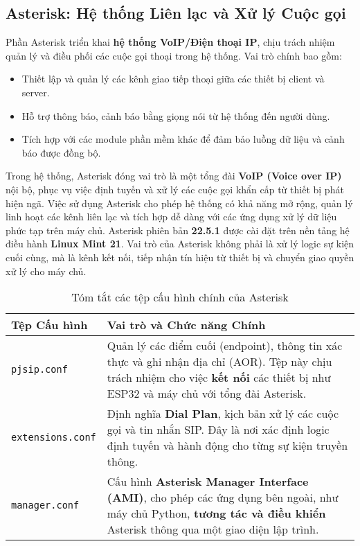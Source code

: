 
\subsection{Asterisk: Hệ thống Liên lạc và Xử lý Cuộc gọi}
\label{sec:asterisk_overview}

Phần Asterisk triển khai \textbf{hệ thống VoIP/Điện thoại IP}, chịu trách nhiệm quản lý và điều phối các cuộc gọi thoại trong hệ thống. Vai trò chính bao gồm:
\begin{itemize}
    \item Thiết lập và quản lý các kênh giao tiếp thoại giữa các thiết bị client và server.
    \item Hỗ trợ thông báo, cảnh báo bằng giọng nói từ hệ thống đến người dùng.
    \item Tích hợp với các module phần mềm khác để đảm bảo luồng dữ liệu và cảnh báo được đồng bộ.
\end{itemize}


Trong hệ thống, Asterisk đóng vai trò là một tổng đài \textbf{VoIP (Voice over IP)} nội bộ, phục vụ việc định tuyến và xử lý các cuộc gọi khẩn cấp từ thiết bị phát hiện ngã. Việc sử dụng Asterisk cho phép hệ thống có khả năng mở rộng, quản lý linh hoạt các kênh liên lạc và tích hợp dễ dàng với các ứng dụng xử lý dữ liệu phức tạp trên máy chủ. Asterisk phiên bản \textbf{22.5.1} được cài đặt trên nền tảng hệ điều hành \textbf{Linux Mint 21}. Vai trò của Asterisk không phải là xử lý logic sự kiện cuối cùng, mà là kênh kết nối, tiếp nhận tín hiệu từ thiết bị và chuyển giao quyền xử lý cho máy chủ.

\begin{table}[h!]
    \centering
    \caption{Tóm tắt các tệp cấu hình chính của Asterisk}
    \label{tab:asterisk_config_files}
    \begin{tabular}{|p{}|p{}|}
        \hline
        \textbf{Tệp Cấu hình} & \textbf{Vai trò và Chức năng Chính} \\
        \hline
        \texttt{pjsip.conf} & Quản lý các điểm cuối (endpoint), thông tin xác thực và ghi nhận địa chỉ (AOR). Tệp này chịu trách nhiệm cho việc \textbf{kết nối} các thiết bị như ESP32 và máy chủ với tổng đài Asterisk. \\
        \hline
        \texttt{extensions.conf} & Định nghĩa \textbf{Dial Plan}, kịch bản xử lý các cuộc gọi và tin nhắn SIP. Đây là nơi xác định logic định tuyến và hành động cho từng sự kiện truyền thông. \\
        \hline
        \texttt{manager.conf} & Cấu hình \textbf{Asterisk Manager Interface (AMI)}, cho phép các ứng dụng bên ngoài, như máy chủ Python, \textbf{tương tác và điều khiển} Asterisk thông qua một giao diện lập trình. \\
        \hline
    \end{tabular}
\end{table}

